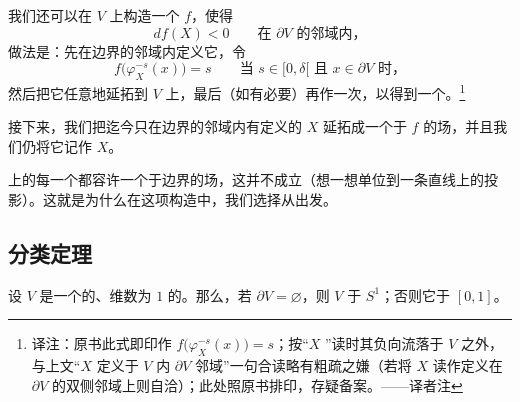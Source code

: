 我们还可以在 $V$ 上构造一个\trMorseFunction{} $f$，使得
\[
df(X)<0 \qquad\text{在 } \partial V \text{ 的邻域内，}
\]
做法是：先在边界的邻域内定义它，令
\[
f\bigl(\varphi_X^{-s}(x)\bigr)=s \qquad\text{当 } s\in[0,\delta[\text{ 且 } x\in\partial V\text{ 时，}
\]
然后把它任意地延拓到 $V$ 上，最后（如有必要）再作一次\trPerturbation，以得到一个\trMorseFunction。\footnote{译注：原书此式即印作 $f\bigl(\varphi_X^{-s}(x)\bigr)=s$；按“$X$ \trIncoming”读时其负向流落于 $V$ 之外，与上文“$X$ 定义于 $V$ 内 $\partial V$ 邻域”一句合读略有粗疏之嫌（若将 $X$ 读作定义在 $\partial V$ 的双侧邻域上则自洽）；此处照原书排印，存疑备案。——译者注}

接下来，我们把迄今只在边界的邻域内有定义的 $X$ 延拓成一个\trAdapted{}于 $f$ 的\trPseudogradient{}场，并且我们仍将它记作 $X$。

\begin{remark}\label{thm:pseudogradient-transversal-boundary}
\trManifoldWithBoundary{}上的每一个\trMorseFunction{}都容许一个\trTransverse{}于边界的\trPseudogradient{}场，这并不成立（想一想单位\trDisk{}到一条直线上的投影）。这就是为什么在这项构造中，我们选择从\trVectorField{}出发。
\end{remark}

\subsection{分类定理}
\label{subsec:classification-theorem}

\begin{theorem}\label{thm:classification-circle-interval}
设 $V$ 是一个\trCompact\trConnected{}的、维数为 $1$ 的\trManifold。那么，若 $\partial V=\varnothing$，则 $V$ \trDiffeomorphic{}于 $S^1$；否则它\trDiffeomorphic{}于 $[0,1]$。
\end{theorem}

